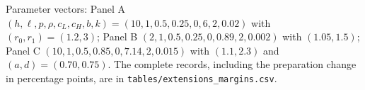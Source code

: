 \begin{landscape}
\begin{table}[tbp]
\begin{threeparttable}
\begin{tablenotes}
\item Parameter vectors: Panel A $(h,\ell,p,\rho,c_L,c_H,b,k)=(10,1,0.5,0.25,0,6,2,0.02)$ with $(r_0,r_1)=(1.2,3)$; Panel B $(2,1,0.5,0.25,0,0.89,2,0.002)$ with $(1.05,1.5)$; Panel C $(10,1,0.5,0.85,0,7.14,2,0.015)$ with $(1.1,2.3)$ and $(a,d)=(0.70,0.75)$. The complete records, including the preparation change in percentage points, are in \texttt{tables/extensions\_margins.csv}.
\end{tablenotes}
\end{threeparttable}
\par\endgroup\end{table}
\end{landscape}
